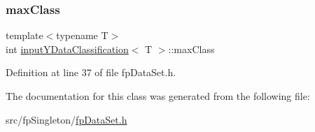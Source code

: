 \subsubsection{\texorpdfstring{max\+Class}{maxClass}}
{\footnotesize\ttfamily template$<$typename T$>$ \\
int \hyperlink{classinputYDataClassification}{input\+Y\+Data\+Classification}$<$ T $>$\+::max\+Class\hspace{0.3cm}{\ttfamily [private]}}



Definition at line 37 of file fp\+Data\+Set.\+h.



The documentation for this class was generated from the following file\+:\begin{DoxyCompactItemize}
\item 
src/fp\+Singleton/\hyperlink{fpDataSet_8h}{fp\+Data\+Set.\+h}\end{DoxyCompactItemize}
